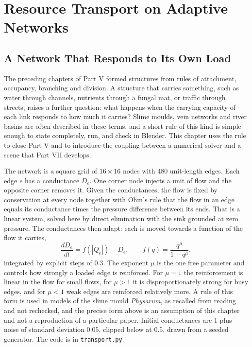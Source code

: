 \chapter{Resource Transport on Adaptive Networks}

\section{A Network That Responds to Its Own Load}

The preceding chapters of Part V formed structures from rules of attachment, occupancy, branching and division. A structure that carries something, such as water through channels, nutrients through a fungal mat, or traffic through streets, raises a further question: what happens when the carrying capacity of each link responds to how much it carries? Slime moulds, vein networks and river basins are often described in these terms, and a short rule of this kind is simple enough to state completely, run, and check in Blender. This chapter uses the rule to close Part V and to introduce the coupling between a numerical solver and a scene that Part VII develops.

The network is a square grid of $16\times16$ nodes with $480$ unit-length edges. Each edge $e$ has a conductance $D_e$. One corner node injects a unit of flow and the opposite corner removes it. Given the conductances, the flow is fixed by conservation at every node together with Ohm's rule that the flow in an edge equals its conductance times the pressure difference between its ends. That is a linear system, solved here by direct elimination with the sink grounded at zero pressure. The conductances then adapt: each is moved towards a function of the flow it carries,
\[
  \frac{dD_e}{dt}=f(|Q_e|)-D_e,\qquad f(q)=\frac{q^\mu}{1+q^\mu},
\]
integrated by explicit steps of $0.3$. The exponent $\mu$ is the one free parameter and controls how strongly a loaded edge is reinforced. For $\mu=1$ the reinforcement is linear in the flow for small flows, for $\mu>1$ it is disproportionately strong for busy edges, and for $\mu<1$ weak edges are reinforced relatively more. A rule of this form is used in models of the slime mould \emph{Physarum}, as recalled from reading and not rechecked, and the precise form above is an assumption of this chapter and not a reproduction of a particular paper. Initial conductances are $1$ plus noise of standard deviation $0.05$, clipped below at $0.5$, drawn from a seeded generator. The code is in \texttt{transport.py}.

